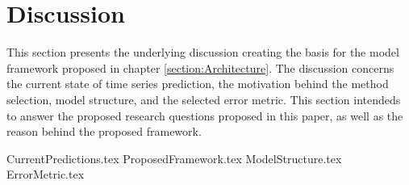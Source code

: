 
\section{Discussion}
\label{section:Discussion:Discussion}



This section presents the underlying discussion creating the basis for the model framework proposed in chapter \ref{section:Architecture}.
The discussion concerns the current state of time series prediction, the motivation behind the method selection, model structure, and the selected error metric.
This section intendeds to answer the proposed research questions proposed in this paper,
as well as the reason behind the proposed framework.


{CurrentPredictions.tex}
{ProposedFramework.tex}
{ModelStructure.tex}
{ErrorMetric.tex}



\iffalse
In the discussion it is important to include a discussion of not just the merits of the work conducted but also the limitations. 
\fi
